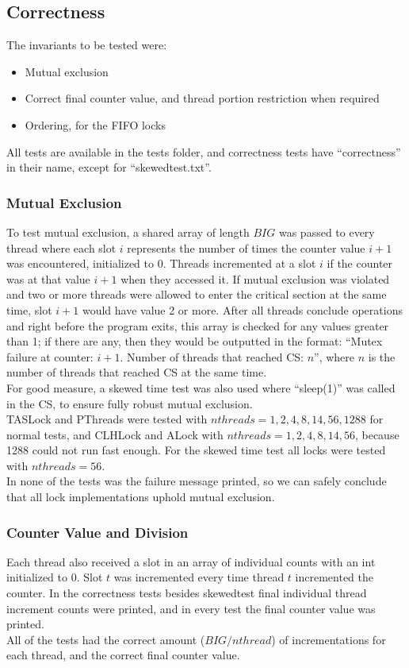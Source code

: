 \documentclass{article}
\begin{document}
\begin{adjustwidth}{-2cm}{-2cm}
\subsection{Correctness}
The invariants to be tested were:
\begin{itemize}
	\item Mutual exclusion
	\item Correct final counter value, and thread portion restriction when required
	\item Ordering, for the FIFO locks
\end{itemize}
All tests are available in the tests folder, and correctness tests have ``correctness'' in their name, except for ``skewedtest.txt''.
\subsubsection{Mutual Exclusion}
To test mutual exclusion, a shared array of length $BIG$ was passed to every thread where each slot $i$ represents the number of times the counter value $i+1$ was encountered, initialized to 0. Threads incremented at a slot $i$ if the counter was at that value $i+1$ when they accessed it. If mutual exclusion was violated and two or more threads were allowed to enter the critical section at the same time, slot $i+1$ would have value 2 or more. After all threads conclude operations and right before the program exits, this array is checked for any values greater than 1; if there are any, then they would be outputted in the format: ``Mutex failure at counter: $i+1$. Number of threads that reached CS: $n$'', where $n$ is the number of threads that reached CS at the same time.\\
For good measure, a skewed time test was also used where ``sleep(1)'' was called in the CS, to ensure fully robust mutual exclusion.\\
TASLock and PThreads were tested with $nthreads = 1, 2, 4, 8, 14, 56, 1288$ for normal tests, and CLHLock and ALock with $nthreads = 1, 2, 4, 8, 14, 56$, because 1288 could not run fast enough. For the skewed time test all locks were tested with $nthreads = 56$.\\
In none of the tests was the failure message printed, so we can safely conclude that all lock implementations uphold mutual exclusion.
\subsubsection{Counter Value and Division}
Each thread also received a slot in an array of individual counts with an int initialized to 0. Slot $t$ was incremented every time thread $t$ incremented the counter. In the correctness tests besides skewedtest final individual thread increment counts were printed, and in every test the final counter value was printed.\\
All of the tests had the correct amount ($BIG/nthread$) of incrementations for each thread, and the correct final counter value.

\end{adjustwidth}
\end{document}
